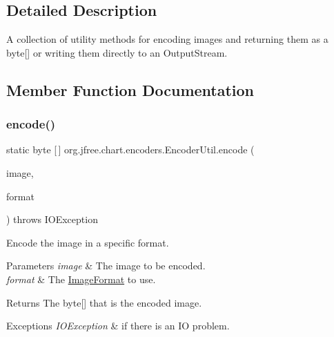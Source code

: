 \subsection{Detailed Description}
A collection of utility methods for encoding images and returning them as a byte\mbox{[}\mbox{]} or writing them directly to an Output\+Stream. 

\subsection{Member Function Documentation}
\mbox{\label{classorg_1_1jfree_1_1chart_1_1encoders_1_1_encoder_util_ab62148769acef556ec785dd08e886ae7}} 
\subsubsection{\texorpdfstring{encode()}{encode()}\hspace{0.1cm}{\footnotesize\ttfamily [1/4]}}
{\footnotesize\ttfamily static byte \mbox{[}$\,$\mbox{]} org.\+jfree.\+chart.\+encoders.\+Encoder\+Util.\+encode (\begin{DoxyParamCaption}\item[{Buffered\+Image}]{image,  }\item[{String}]{format }\end{DoxyParamCaption}) throws I\+O\+Exception\hspace{0.3cm}{\ttfamily [static]}}

Encode the image in a specific format.


\begin{DoxyParams}{Parameters}
{\em image} & The image to be encoded. \\
\hline
{\em format} & The \mbox{\hyperlink{interfaceorg_1_1jfree_1_1chart_1_1encoders_1_1_image_format}{Image\+Format}} to use.\\
\hline
\end{DoxyParams}
\begin{DoxyReturn}{Returns}
The byte\mbox{[}\mbox{]} that is the encoded image. 
\end{DoxyReturn}

\begin{DoxyExceptions}{Exceptions}
{\em I\+O\+Exception} & if there is an IO problem. \\
\hline
\end{DoxyExceptions}
\mbox{\label{classorg_1_1jfree_1_1chart_1_1encoders_1_1_encoder_util_a74c7ce7c56566304fb11e00cf5a988db}} 
